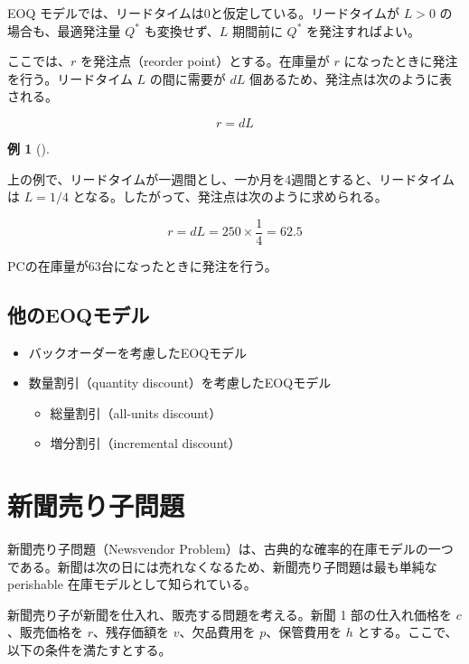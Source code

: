 \documentclass[
  japanese,
  letterpaper,
]{ltjbook}
\providecommand{\tightlist}{%
  \setlength{\itemsep}{0pt}\setlength{\parskip}{0pt}}
\theoremstyle{plain}
\theoremstyle{definition}
\newtheorem{example}{例}[chapter]
\theoremstyle{remark}
\begin{document}
EOQ モデルでは、リードタイムは0と仮定している。リードタイムが \(L > 0\)
の場合も、最適発注量 \(Q^*\) も変換せず、\(L\) 期間前に \(Q^*\)
を発注すればよい。

ここでは、\(r\) を発注点（reorder point）とする。在庫量が \(r\)
になったときに発注を行う。リードタイム \(L\) の間に需要が \(dL\)
個あるため、発注点は次のように表される。

\[
r = dL
\]

\begin{example}[]\protect\hypertarget{exm-reorder-point}{}\label{exm-reorder-point}

上の例で、リードタイムが一週間とし、一か月を4週間とすると、リードタイムは
\(L = 1/4\) となる。したがって、発注点は次のように求められる。

\[
r = dL = 250 \times \frac{1}{4} = 62.5
\]

PCの在庫量が63台になったときに発注を行う。

\end{example}

\section{他のEOQモデル}\label{ux4ed6ux306eeoqux30e2ux30c7ux30eb}

\begin{itemize}
\tightlist
\item
  バックオーダーを考慮したEOQモデル
\item
  数量割引（quantity discount）を考慮したEOQモデル

  \begin{itemize}
  \tightlist
  \item
    総量割引（all-units discount）
  \item
    増分割引（incremental discount）
  \end{itemize}
\end{itemize}

\chapter{新聞売り子問題}\label{ux65b0ux805eux58f2ux308aux5b50ux554fux984c}

新聞売り子問題（Newsvendor
Problem）は、古典的な確率的在庫モデルの一つである。新聞は次の日には売れなくなるため、新聞売り子問題は最も単純な
perishable 在庫モデルとして知られている。

新聞売り子が新聞を仕入れ、販売する問題を考える。新聞 1 部の仕入れ価格を
\(c\)、販売価格を \(r\)、残存価額を \(v\)、欠品費用を \(p\)、保管費用を
\(h\) とする。ここで、以下の条件を満たすとする。
\end{document}
